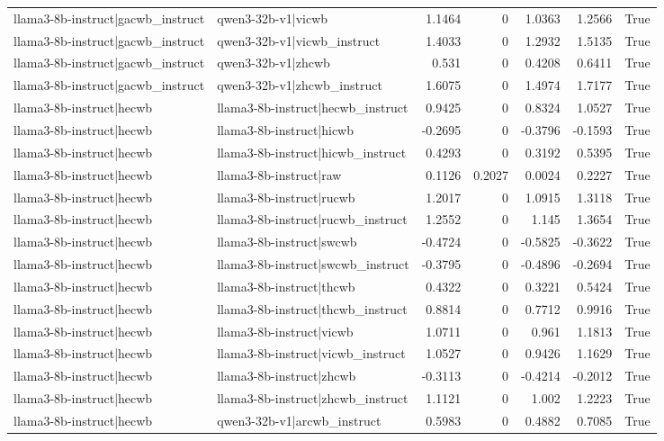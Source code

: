 \begin{table}
\begin{tabular}{l l r r r r l}
llama3-8b-instruct|gacwb_instruct & qwen3-32b-v1|vicwb & 1.1464 & 0 & 1.0363 & 1.2566 & True \\
llama3-8b-instruct|gacwb_instruct & qwen3-32b-v1|vicwb_instruct & 1.4033 & 0 & 1.2932 & 1.5135 & True \\
llama3-8b-instruct|gacwb_instruct & qwen3-32b-v1|zhcwb & 0.531 & 0 & 0.4208 & 0.6411 & True \\
llama3-8b-instruct|gacwb_instruct & qwen3-32b-v1|zhcwb_instruct & 1.6075 & 0 & 1.4974 & 1.7177 & True \\
llama3-8b-instruct|hecwb & llama3-8b-instruct|hecwb_instruct & 0.9425 & 0 & 0.8324 & 1.0527 & True \\
llama3-8b-instruct|hecwb & llama3-8b-instruct|hicwb & -0.2695 & 0 & -0.3796 & -0.1593 & True \\
llama3-8b-instruct|hecwb & llama3-8b-instruct|hicwb_instruct & 0.4293 & 0 & 0.3192 & 0.5395 & True \\
llama3-8b-instruct|hecwb & llama3-8b-instruct|raw & 0.1126 & 0.2027 & 0.0024 & 0.2227 & True \\
llama3-8b-instruct|hecwb & llama3-8b-instruct|rucwb & 1.2017 & 0 & 1.0915 & 1.3118 & True \\
llama3-8b-instruct|hecwb & llama3-8b-instruct|rucwb_instruct & 1.2552 & 0 & 1.145 & 1.3654 & True \\
llama3-8b-instruct|hecwb & llama3-8b-instruct|swcwb & -0.4724 & 0 & -0.5825 & -0.3622 & True \\
llama3-8b-instruct|hecwb & llama3-8b-instruct|swcwb_instruct & -0.3795 & 0 & -0.4896 & -0.2694 & True \\
llama3-8b-instruct|hecwb & llama3-8b-instruct|thcwb & 0.4322 & 0 & 0.3221 & 0.5424 & True \\
llama3-8b-instruct|hecwb & llama3-8b-instruct|thcwb_instruct & 0.8814 & 0 & 0.7712 & 0.9916 & True \\
llama3-8b-instruct|hecwb & llama3-8b-instruct|vicwb & 1.0711 & 0 & 0.961 & 1.1813 & True \\
llama3-8b-instruct|hecwb & llama3-8b-instruct|vicwb_instruct & 1.0527 & 0 & 0.9426 & 1.1629 & True \\
llama3-8b-instruct|hecwb & llama3-8b-instruct|zhcwb & -0.3113 & 0 & -0.4214 & -0.2012 & True \\
llama3-8b-instruct|hecwb & llama3-8b-instruct|zhcwb_instruct & 1.1121 & 0 & 1.002 & 1.2223 & True \\
llama3-8b-instruct|hecwb & qwen3-32b-v1|arcwb_instruct & 0.5983 & 0 & 0.4882 & 0.7085 & True \\

\end{tabular}
\end{table}
